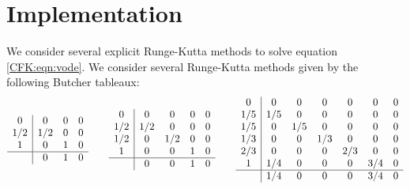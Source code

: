 \documentclass{csri19}
\begin{document}
\section{Implementation}\label{CFK:sec:implementation}
We consider several explicit Runge-Kutta methods to solve equation 
\ref{CFK:eqn:vode}. We consider several Runge-Kutta methods given by the 
following Butcher tableaux:
\[
 \begin{array}{c|ccc}
0   & 0   & 0 & 0\\
1/2 & 1/2 & 0 & 0\\
1   & 0   & 1 & 0\\
\hline
    & 0   & 1 & 0
\end{array}\qquad
\begin{array}{c|cccc}
0   & 0   & 0   & 0 & 0\\
1/2 & 1/2 & 0   & 0 & 0\\
1/2 & 0   & 1/2 & 0 & 0\\
1   & 0   & 0   & 1 & 0\\
\hline
    & 0   & 0   & 1 & 0
\end{array}\qquad
\begin{array}{c|cccccc}
0   & 0   & 0   & 0   & 0   & 0   & 0\\
1/5 & 1/5 & 0   & 0   & 0   & 0   & 0\\
1/5 & 0   & 1/5 & 0   & 0   & 0   & 0\\
1/3 & 0   & 0   & 1/3 & 0   & 0   & 0\\
2/3 & 0   & 0   & 0   & 2/3 & 0   & 0\\
1   & 1/4 & 0   & 0   & 0   & 3/4 & 0\\
\hline
    & 1/4 & 0   & 0   & 0   & 3/4 & 0
\end{array}
\]
\end{document}
